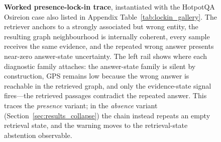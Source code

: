 \begin{figure}[t]
{%
}
\caption{%
  \textbf{Worked presence-lock-in trace}, instantiated with the
  HotpotQA Osireion case also listed in
  Appendix Table~\ref{tab:lockin_gallery}.
  The retriever anchors to a strongly associated but wrong entity, the
  resulting graph neighbourhood is internally coherent, every sample receives
  the same evidence, and the repeated wrong answer presents near-zero
  answer-state uncertainty.
  The left rail shows where each diagnostic family attaches: the answer-state
  family is silent by construction, GPS remains low because the wrong answer
  is reachable in the retrieved graph, and only the evidence-state signal
  fires---the retrieved passages contradict the repeated answer.
  This traces the \emph{presence} variant; in the \emph{absence} variant
  (Section~\ref{sec:results_collapse}) the chain instead repeats an empty
  retrieval state, and the warning moves to the retrieval-state abstention
  observable.%
}
\label{fig:lockin_trace}
\end{figure}
